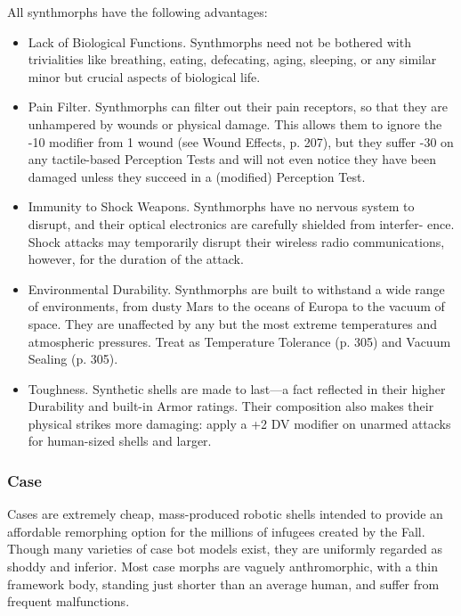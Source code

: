 All synthmorphs have the following advantages:

\begin{itemize}
\item Lack of Biological Functions. Synthmorphs need not be bothered with trivialities like breathing, eating, defecating, aging, sleeping, or any similar minor but crucial aspects of biological life.
\item Pain Filter. Synthmorphs can filter out their pain receptors, so that they are unhampered by wounds or physical damage. This allows them to ignore the -10 modifier from 1 wound (see Wound Effects, p. 207), but they suffer -30 on any tactile-based Perception Tests and will not even notice they have been damaged unless they succeed in a (modified) Perception Test.
\item Immunity to Shock Weapons. Synthmorphs have no nervous system to disrupt, and their optical electronics are carefully shielded from interfer- ence. Shock attacks may temporarily disrupt their wireless radio communications, however, for the duration of the attack.
\item Environmental Durability. Synthmorphs are built to withstand a wide range of environments, from dusty Mars to the oceans of Europa to the vacuum of space. They are unaffected by any but the most extreme temperatures and atmospheric pressures. Treat as Temperature Tolerance (p. 305) and Vacuum Sealing (p. 305).
\item Toughness. Synthetic shells are made to last—a fact reflected in their higher Durability and built-in Armor ratings. Their composition also makes their physical strikes more damaging: apply a +2 DV modifier on unarmed attacks for human-sized shells and larger.
\end{itemize}

\subsubsection{Case}
\label{sec:starting-case}

Cases are extremely cheap, mass-produced robotic shells intended to provide an affordable remorphing option for the millions of infugees created by the Fall. Though many varieties of case bot models exist, they are uniformly regarded as shoddy and inferior. Most case morphs are vaguely anthromorphic, with a thin framework body, standing just shorter than an average human, and suffer from frequent malfunctions.

